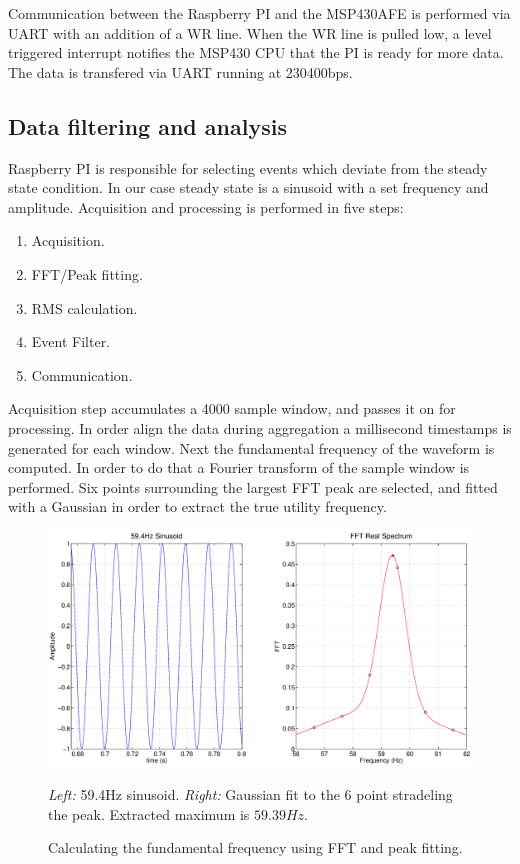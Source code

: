 Communication between the Raspberry PI and the MSP430AFE is performed via UART with an addition of a WR line. When the WR line is pulled low, a level triggered interrupt notifies the MSP430 CPU
that the PI is ready for more data. The data is transfered via UART running at 230400bps.

\subsection{Data filtering and analysis}
	Raspberry PI is responsible for selecting events which deviate from the steady state condition. In our case steady state is a sinusoid with a set frequency and amplitude. Acquisition and processing
is performed in five steps:
\begin{enumerate}
\item Acquisition.
\item FFT/Peak fitting.
\item RMS calculation.
\item Event Filter.
\item Communication.
\end{enumerate}

	Acquisition step accumulates a 4000 sample window, and passes it on for processing. In order align the data during aggregation a millisecond timestamps is generated for each window.
Next the fundamental frequency of the waveform is computed. In order to do that a Fourier transform of the sample window is performed. Six points surrounding the largest FFT peak are selected,
and fitted  with a Gaussian in order to extract the true utility frequency.  

\begin{figure}[h!]
\begin{center}
\includegraphics[width=\textwidth]{img/fftFit.eps}
\end{center}
\caption{Calculating the fundamental frequency using FFT and peak fitting.}\textit{Left:} 59.4Hz sinusoid. \textit{Right:} Gaussian fit to the 6 point stradeling the peak. Extracted maximum is $59.39Hz$.
\end{figure}

